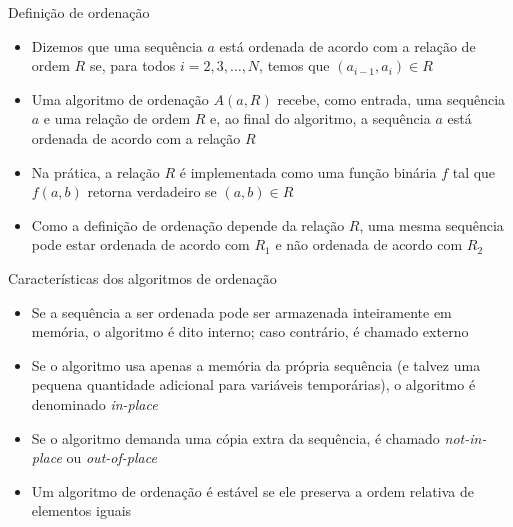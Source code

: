 \begin{frame}[fragile]{Definição de ordenação}

    \begin{itemize}
        \item Dizemos que uma sequência $a$ está ordenada de acordo com a relação de 
            ordem $R$ se, para todos $i = 2, 3, \ldots, N$, temos que $(a_{i - 1}, a_i) \in R$

        \item Uma algoritmo de ordenação $A(a, R)$ recebe, como entrada, uma sequência $a$ e 
            uma relação de ordem $R$ e, ao final do algoritmo, a sequência $a$ está ordenada de 
            acordo com a relação $R$

        \item Na prática, a relação $R$ é implementada como uma função binária $f$ tal que
            $f(a, b)$ retorna verdadeiro se $(a, b)\in R$

        \item Como a definição de ordenação depende da relação $R$, uma mesma sequência pode
            estar ordenada de acordo com $R_1$ e não ordenada de acordo com $R_2$

    \end{itemize}

\end{frame}

\begin{frame}[fragile]{Características dos algoritmos de ordenação}

    \begin{itemize}
        \item Se a sequência a ser ordenada pode ser armazenada inteiramente em memória, o 
            algoritmo é dito interno; caso contrário, é chamado externo

        \item Se o algoritmo usa apenas a memória da própria sequência (e talvez uma pequena
            quantidade adicional para variáveis temporárias), o algoritmo é denominado
            \textit{in-place}

        \item Se o algoritmo demanda uma cópia extra da sequência, é chamado \textit{not-in-place}
            ou \textit{out-of-place}

        \item Um algoritmo de ordenação é estável se ele preserva a ordem relativa de elementos 
            iguais

    \end{itemize}

\end{frame}
